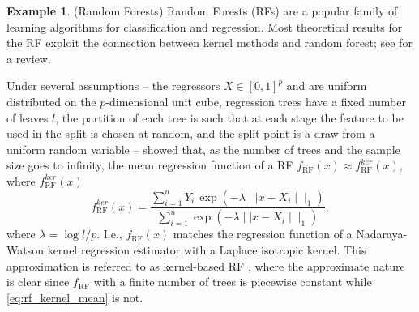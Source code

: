 \documentclass{article}
\theoremstyle{definition}
\newtheorem{example}{Example}
\renewcommand{\&}{and}
\begin{document}
\begin{example}(Random Forests) Random Forests (RFs) are a popular family of learning algorithms for classification and regression. %
Most theoretical results for the RF exploit the connection between kernel methods and random forest; see \cite{biau2016random} for a review.%

Under several assumptions -- the regressors $X\in [0,1]^p$ %
and are uniform distributed on the $p$-dimensional unit cube, regression trees have a fixed number of leaves $l$, the partition of each tree is such that at each stage the feature to be used in the split is chosen at random, and the split point is a draw from a uniform random variable -- \cite{breiman2000some} showed that, as the number of trees and the sample size goes to infinity, the mean regression function of a RF $f_{\text{RF}} (x)\approx f^{ker}_{\text{RF}} (x)$, where $f^{ker}_{\text{RF}} (x)$
\begin{equation}\label{eq:rf_kernel_mean}
f^{ker}_{\text{RF}} (x) =\frac{\sum_{i=1}^n Y_i \, \exp( -\lambda \mid\mid x-X_i\mid\mid_1)}{\sum_{i=1}^n   \exp( -\lambda \mid\mid x-X_i\mid\mid_1)},
\end{equation}
where $\lambda= \log l/p$. I.e., $f_{\text{RF}} (x)$ matches the regression function of a Nadaraya-Watson kernel regression estimator with a Laplace isotropic kernel. This approximation is referred to as kernel-based RF \citep{scornet2016random}, where the approximate nature is clear since $f_{\text{RF}}$ with a finite number of trees is piecewise constant while \eqref{eq:rf_kernel_mean} is not. %





\end{example}
\end{document}

